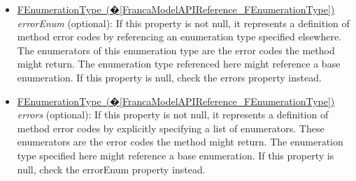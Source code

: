 \documentclass[a4paper,10pt]{scrreprt}
\newlength{\XdocItemIndent}
\begin{document}
\begin{itemize}
\begin{minipage}[t]{\XdocItemIndent}
\end{minipage}
\item \begin{minipage}[t]{\XdocItemIndent}
\hyperref[FrancaModelAPIReference_FEnumerationType]{FEnumerationType~(�\ref*{FrancaModelAPIReference_FEnumerationType})} \textit{errorEnum} (optional): If this property is not null, it represents a definition of method error codes by referencing an enumeration type specified elsewhere. The enumerators of this enumeration type are the error codes the method might return. The enumeration type referenced here might reference a base enumeration. If this property is null, check the errors property instead.

\end{minipage}
\item \begin{minipage}[t]{\XdocItemIndent}
\hyperref[FrancaModelAPIReference_FEnumerationType]{FEnumerationType~(�\ref*{FrancaModelAPIReference_FEnumerationType})} \textit{errors} (optional): If this property is not null, it represents a definition of method error codes by explicitly specifying a list of enumerators. These enumerators are the error codes the method might return. The enumeration type specified here might reference a base enumeration. If this property is null, check the errorEnum property instead.

\end{minipage}
\end{itemize}
\addtolength{\XdocItemIndent}{2.5em}
\end{document}
